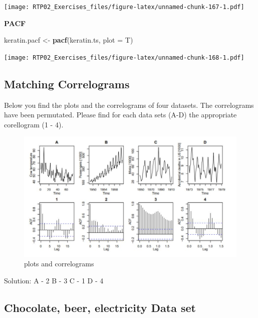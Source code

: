 \documentclass[
]{article}
\newenvironment{Shaded}{\begin{snugshade}}{\end{snugshade}}
\newcommand{\DataTypeTok}[1]{\textcolor[rgb]{0.13,0.29,0.53}{#1}}
\newcommand{\KeywordTok}[1]{\textcolor[rgb]{0.13,0.29,0.53}{\textbf{#1}}}
\newcommand{\NormalTok}[1]{#1}
\newcommand{\StringTok}[1]{\textcolor[rgb]{0.31,0.60,0.02}{#1}}
\begin{document}
\texttt{[image: RTP02\_Exercises\_files/figure-latex/unnamed-chunk-167-1.pdf]}

\textbf{PACF}

\begin{Shaded}
\begin{Highlighting}[]
\NormalTok{keratin.pacf <-}\StringTok{ }\KeywordTok{pacf}\NormalTok{(keratin.ts, }\DataTypeTok{plot =}\NormalTok{ T)}
\end{Highlighting}
\end{Shaded}

\texttt{[image: RTP02\_Exercises\_files/figure-latex/unnamed-chunk-168-1.pdf]}

\hypertarget{matching-correlograms}{%
\subsection{Matching Correlograms}\label{matching-correlograms}}

Below you find the plots and the correlograms of four datasets. The
correlograms have been permutated. Please find for each data sets (A-D)
the appropriate corellogram (1 - 4).

\begin{figure}
\includegraphics[width=1\linewidth]{Exercise_3.1} \caption{plots and correlograms}\label{fig:unnamed-chunk-169}
\end{figure}

Solution: A - 2 B - 3 C - 1 D - 4

\hypertarget{chocolate-beer-electricity-data-set}{%
\subsection{Chocolate, beer, electricity Data
set}\label{chocolate-beer-electricity-data-set}}
\end{document}

